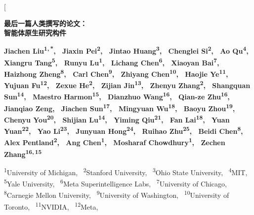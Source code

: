 \documentclass[
]{article}
\author{}
\date{}
\theoremstyle{definition}
\begin{document}
\twocolumn[
  \thispagestyle{plain}
  \begin{headerpanel}
    \raggedright
    {\sffamily\bfseries\fontsize{19}{23}\selectfont
      最后一篇人类撰写的论文：\\
      智能体原生研究构件\par
    }
    \vskip 12pt
    {\sffamily\bfseries\normalsize
      Jiachen Liu\textsuperscript{1,\,*},\ %
      Jiaxin Pei\textsuperscript{2},\ %
      Jintao Huang\textsuperscript{3},\ %
      Chenglei Si\textsuperscript{2},\ %
      Ao Qu\textsuperscript{4},\ %
      Xiangru Tang\textsuperscript{5},\ %
      Runyu Lu\textsuperscript{1},\ %
      Lichang Chen\textsuperscript{6},\ %
      Xiaoyan Bai\textsuperscript{7},\ %
      Haizhong Zheng\textsuperscript{8},\ %
      Carl Chen\textsuperscript{9},\ %
      Zhiyang Chen\textsuperscript{10},\ %
      Haojie Ye\textsuperscript{11},\ %
      Yujuan Fu\textsuperscript{12},\ %
      Zexue He\textsuperscript{2},\ %
      Zijian Jin\textsuperscript{13},\ %
      Zhenyu Zhang\textsuperscript{2},\ %
      Shangquan Sun\textsuperscript{14},\ %
      Maestro Harmon\textsuperscript{15},\ %
      Dianzhuo Wang\textsuperscript{16},\ %
      Qian-ze Zhu\textsuperscript{16},\ %
      Jianqiao Zeng,\ %
      Jiachen Sun\textsuperscript{17},\ %
      Mingyuan Wu\textsuperscript{18},\ %
      Baoyu Zhou\textsuperscript{19},\ %
      Chenyu You\textsuperscript{20},\ %
      Shijian Lu\textsuperscript{14},\ %
      Yiming Qiu\textsuperscript{21},\ %
      Fan Lai\textsuperscript{18},\ %
      Yuan Yuan\textsuperscript{22},\ %
      Yao Li\textsuperscript{23},\ %
      Junyuan Hong\textsuperscript{24},\ %
      Ruihao Zhu\textsuperscript{25},\ %
      Beidi Chen\textsuperscript{8},\ %
      Alex Pentland\textsuperscript{2},\ %
      Ang Chen\textsuperscript{1},\ %
      Mosharaf Chowdhury\textsuperscript{1},\ %
      Zechen Zhang\textsuperscript{16,\,15}\par
    }
    \vskip 6pt
    {\small
      \textsuperscript{1}University of Michigan,\ %
      \textsuperscript{2}Stanford University,\ %
      \textsuperscript{3}Ohio State University,\ %
      \textsuperscript{4}MIT,\ %
      \textsuperscript{5}Yale University,\ %
      \textsuperscript{6}Meta Superintelligence Labs,\ %
      \textsuperscript{7}University of Chicago,\ %
      \textsuperscript{8}Carnegie Mellon University,\ %
      \textsuperscript{9}University of Washington,\ %
      \textsuperscript{10}University of Toronto,\ %
      \textsuperscript{11}NVIDIA,\ %
      \textsuperscript{12}Meta,\ %
}
\end{headerpanel}
\end{document}
